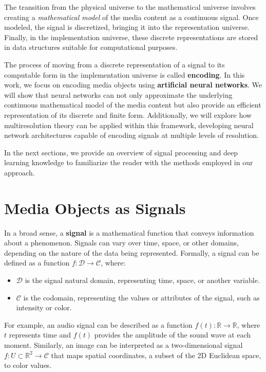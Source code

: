 The transition from the physical universe to the mathematical universe involves creating a \textit{mathematical model} of the media content as a continuous signal. Once modeled, the signal is discretized, bringing it into the representation universe. Finally, in the implementation universe, these discrete representations are stored in data structures suitable for computational purposes.

The process of moving from a discrete representation of a signal to its computable form in the implementation universe is called \textbf{encoding}. In this work, we focus on encoding media objects using \textbf{artificial neural networks}. We will show that neural networks can not only approximate the underlying continuous mathematical model of the media content but also provide an efficient representation of its discrete and finite form. Additionally, we will explore how multiresolution theory can be applied within this framework, developing neural network architectures capable of encoding signals at multiple levels of resolution.

In the next sections, we provide an overview of signal processing and deep learning knowledge to familiarize the reader  with the methods employed in our approach.


\section{Media Objects as Signals}

In a broad sense, a \textbf{signal} is a mathematical function that conveys information about a phenomenon. Signals can vary over time, space, or other domains, depending on the nature of the data being represented. Formally, a signal can be defined as a function \( f: \mathcal{D} \to \mathcal{C} \), where:

\begin{itemize}
  \item \( \mathcal{D} \) is the signal natural domain, representing time, space, or another variable.
  \item \( \mathcal{C} \) is the codomain, representing the values or attributes of the signal, such as intensity or color.
\end{itemize}

For example, an audio signal can be described as a function \( f(t): \mathbb{R} \to \mathbb{R} \), where \( t \) represents time and \( f(t) \) provides the amplitude of the sound wave at each moment. Similarly, an image can be interpreted as a two-dimensional signal \( f: U \subset \mathbb{R}^2 \to \mathcal{C} \) that maps spatial coordinates, a subset of the 2D Euclidean space, to color values. 

